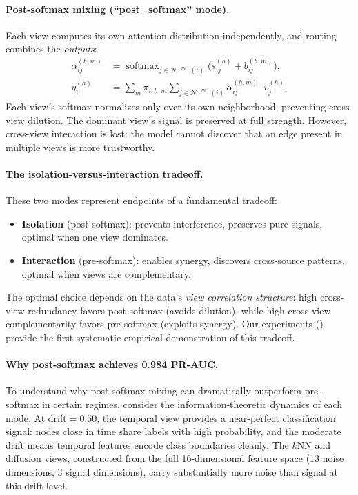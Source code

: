 \documentclass[11pt,a4paper]{article}
\newcommand{\calN}{\mathcal{N}}
\DeclareMathOperator{\softmax}{softmax}
\begin{document}
\paragraph{Post-softmax mixing (``post\_softmax'' mode).}
Each view computes its own attention distribution independently, and
routing combines the \emph{outputs}:
\begin{align}
  \alpha_{ij}^{(h,m)} &= \softmax_{j \in \calN^{(m)}(i)}\!\Big(
    s_{ij}^{(h)} + b_{ij}^{(h,m)}\Big),
  \label{eq:postsoftmax_attn} \\
  y_i^{(h)} &= \sum_{m} \pi_{i,h,m} \sum_{j \in \calN^{(m)}(i)}
    \alpha_{ij}^{(h,m)} \cdot v_j^{(h)}.
  \label{eq:postsoftmax_agg}
\end{align}
Each view's softmax normalizes only over its own neighborhood, preventing
cross-view dilution.
The dominant view's signal is preserved at full strength.
However, cross-view interaction is lost: the model cannot discover that
an edge present in multiple views is more trustworthy.

\paragraph{The isolation-versus-interaction tradeoff.}
These two modes represent endpoints of a fundamental tradeoff:
\begin{itemize}[nosep]
  \item \textbf{Isolation} (post-softmax): prevents interference,
    preserves pure signals, optimal when one view dominates.
  \item \textbf{Interaction} (pre-softmax): enables synergy, discovers
    cross-source patterns, optimal when views are complementary.
\end{itemize}
The optimal choice depends on the data's \emph{view correlation
structure}: high cross-view redundancy favors post-softmax (avoids
dilution), while high cross-view complementarity favors pre-softmax
(exploits synergy).
Our experiments () provide the first systematic
empirical demonstration of this tradeoff.

\paragraph{Why post-softmax achieves 0.984 PR-AUC.}
To understand why post-softmax mixing can dramatically outperform
pre-softmax in certain regimes, consider the information-theoretic
dynamics of each mode.
At drift${} = 0.50$, the temporal view provides a near-perfect
classification signal: nodes close in time share labels with high
probability, and the moderate drift means temporal features encode class
boundaries cleanly.
The $k$NN and diffusion views, constructed from the full 16-dimensional
feature space (13 noise dimensions, 3 signal dimensions), carry
substantially more noise than signal at this drift level.
\end{document}
